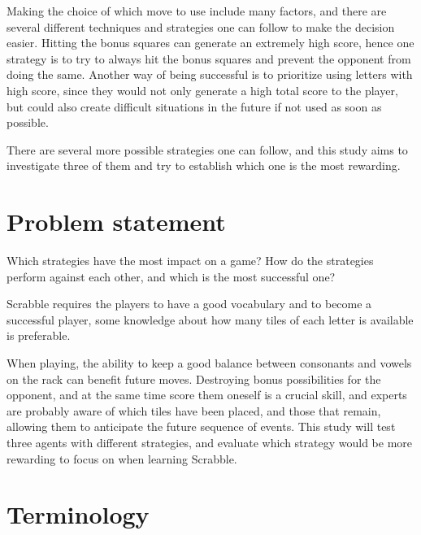 \documentclass[a4paper, 12pt]{report}
\begin{document}
Making the choice of which move to use include many factors, and there are several different techniques and strategies one can follow to make the decision easier. Hitting the bonus squares can generate an extremely high score, hence one strategy is to try to always hit the bonus squares and prevent the opponent from doing the same. Another way of being successful is to prioritize using letters with high score, since they would not only generate a high total score to the player, but could also create difficult situations in the future if not used as soon as possible.

There are several more possible strategies one can follow, and this study aims to investigate three of them and try to establish which one is the most rewarding.

\section{Problem statement}
Which strategies have the most impact on a game? How do the strategies perform against each other, and which is the most successful one?

Scrabble requires the players to have a good vocabulary and to become a successful player, some knowledge about how many tiles of each letter is available is preferable. 

When playing, the ability to keep a good balance between consonants and vowels on the rack can benefit future moves. Destroying bonus possibilities for the opponent, and at the same time score them oneself is a crucial skill, and experts are probably aware of which tiles have been placed, and those that remain, allowing them to anticipate the future sequence of events. This study will test three agents with different strategies, and evaluate which strategy would be more rewarding to focus on when learning Scrabble.


\section {Terminology}
\label{sec:terminology}
\end{document}
